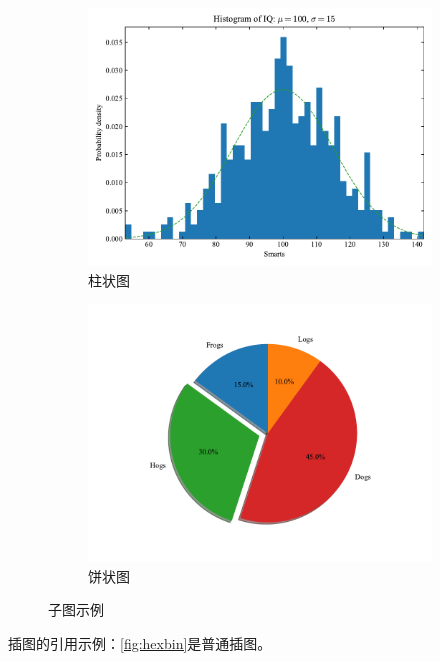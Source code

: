 \begin{figure}[!htp]
	\centering
    \begin{subfigure}{0.45\textwidth}
        \centering
	    \includegraphics[width=1\textwidth]{figures/histogram.pdf}
	    \caption{柱状图}
    \end{subfigure}
    \begin{subfigure}{0.45\textwidth}
        \centering
	    \includegraphics[width=1\textwidth]{figures/piechart.pdf}
	    \caption{饼状图}
    \end{subfigure}
    \caption{子图示例}
    \label{fig:subfig}
\end{figure}

插图的引用示例：\ref{fig:hexbin}是普通插图。

